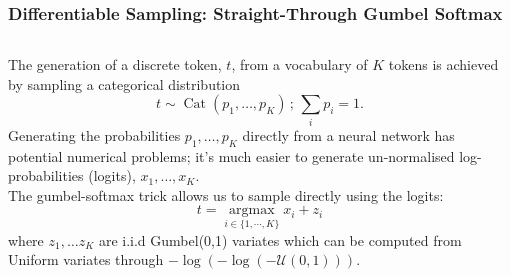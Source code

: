 \documentclass[\beamerclass,aspectratio=1610]{beamer}
\begin{document}
\begin{frame}
\frametitle{Differentiable Sampling: Straight-Through Gumbel Softmax}

\begin{columns}[T]



The generation of a discrete token, $t$, from a vocabulary of $K$ tokens is achieved by sampling a categorical distribution 
\begin{equation*}
t \sim \operatorname{Cat}(p_1, \dots, p_K)\,; \,\sum_i p_i=1.
\end{equation*} \pause
Generating the probabilities $p_1, \dots, p_K$ directly from a neural network has potential numerical problems; it's much easier to generate un-normalised log-probabilities (logits), $x_1, \dots, x_K$. \pause
\\[0.5em]
The gumbel-softmax trick allows us to sample directly using the logits: 
\begin{equation*}
t = \underset{ i \in \{1,\cdots,K\} }{\operatorname{argmax}} x_i + z_i
\end{equation*}
where $z_1, \dots z_K$ are i.i.d Gumbel(0,1) variates  which can be computed from Uniform variates through $-\log(-\log(-\mathcal{U}(0,1)))$.
\end{columns}


\end{frame}
\end{document}
